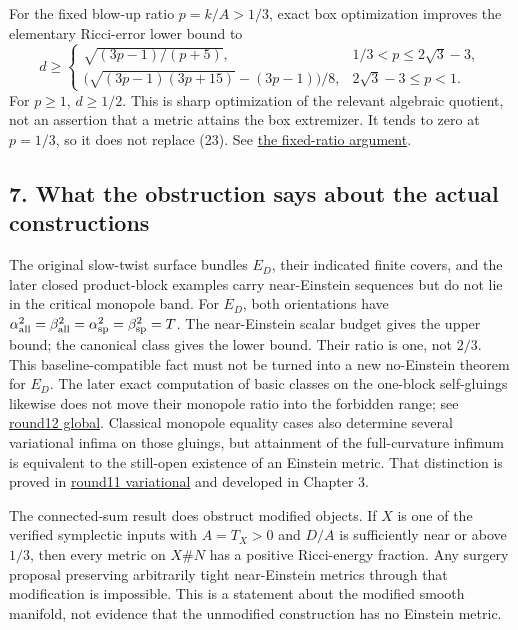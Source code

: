 \documentclass[
  english,
]{article}
\begin{document}
For the fixed blow-up ratio \(p=k/A>1/3\), exact box optimization
improves the elementary Ricci-error lower bound to \[
 d\ge
 \begin{cases}
 \sqrt{(3p-1)/(p+5)},&1/3<p\le2\sqrt3-3,\\
 \bigl(\sqrt{(3p-1)(3p+15)}-(3p-1)\bigr)/8,
                         &2\sqrt3-3\le p<1 .
 \end{cases}
\] For \(p\ge1\), \(d\ge1/2\). This is sharp optimization of the
relevant algebraic quotient, not an assertion that a metric attains the
box extremizer. It tends to zero at \(p=1/3\), so it does not replace
(23). See \href{../proofs/fixed_ratio.md}{the fixed-ratio argument}.

\hypertarget{what-the-obstruction-says-about-the-actual-constructions}{%
\subsection{7. What the obstruction says about the actual
constructions}\label{what-the-obstruction-says-about-the-actual-constructions}}

The original slow-twist surface bundles \(E_D\), their indicated finite
covers, and the later closed product-block examples carry near-Einstein
sequences but do not lie in the critical monopole band. For \(E_D\),
both orientations have
\(\alpha_{\rm all}^2=\beta_{\rm all}^2 =\alpha_{\rm sp}^2=\beta_{\rm sp}^2=T\).
The near-Einstein scalar budget gives the upper bound; the canonical
class gives the lower bound. Their ratio is one, not \(2/3\). This
baseline-compatible fact must not be turned into a new no-Einstein
theorem for \(E_D\). The later exact computation of basic classes on the
one-block self-gluings likewise does not move their monopole ratio into
the forbidden range; see \href{../proofs/round12_global.md}{round12
global}. Classical monopole equality cases also determine several
variational infima on those gluings, but attainment of the
full-curvature infimum is equivalent to the still-open existence of an
Einstein metric. That distinction is proved in
\href{../proofs/round11_variational.md}{round11 variational} and
developed in Chapter 3.

The connected-sum result does obstruct modified objects. If \(X\) is one
of the verified symplectic inputs with \(A=T_X>0\) and \(D/A\) is
sufficiently near or above \(1/3\), then every metric on \(X\#N\) has a
positive Ricci-energy fraction. Any surgery proposal preserving
arbitrarily tight near-Einstein metrics through that modification is
impossible. This is a statement about the modified smooth manifold, not
evidence that the unmodified construction has no Einstein metric.
\end{document}
